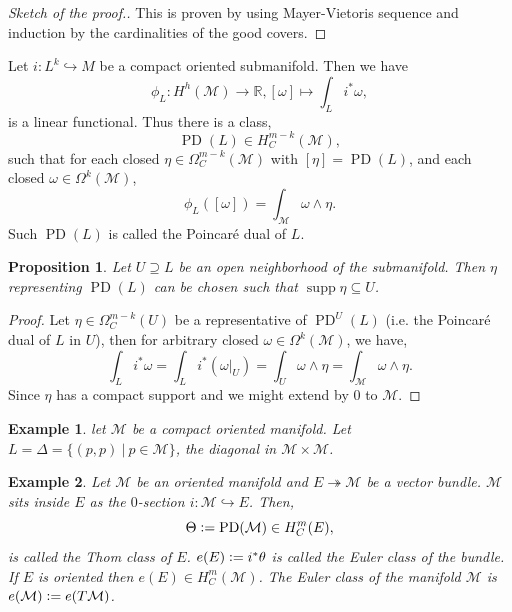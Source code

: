 \documentclass[10pt]{article}
\newtheorem{proposition}{Proposition}[section]
\newtheorem{example}{Example}[section]
\DeclareMathOperator{\supp}{supp}
\DeclareMathOperator{\PD}{PD}
\newcommand{\defeq}{\vcentcolon=}
\newcommand{\R}[0]{\mathbb{R}}
\newcommand{\M}[0]{\mathcal{M}}
\newcommand{\sep}[0]{\:|\:}
\begin{document}
\begin{proof}[Sketch of the proof.]
  This is proven by using Mayer-Vietoris sequence and induction by the cardinalities of the good covers.
\end{proof}
Let $i:L^k\hookrightarrow M$ be a compact oriented submanifold. Then we have 
\begin{equation*}
  \phi_L:H^h(\M)\to\R, [\omega]\mapsto\int_L i^*\omega,
\end{equation*}
is a linear functional. Thus there is a class, 
\begin{equation*}
  \PD(L) \in H^{m-k}_C(\M),
\end{equation*}
such that for each closed $\eta\in\Omega_C^{m-k}(\M)$ with $[\eta]=\PD(L)$, and each closed $\omega\in\Omega^k(\M)$,
\begin{equation*}
  \phi_L([\omega]) = \int_\M\omega\wedge\eta.
\end{equation*}
Such $\PD(L)$ is called the Poincaré dual of $L$.
\begin{proposition}
  Let $U\supseteq L$ be an open neighborhood of the submanifold. Then $\eta$ representing $\PD(L)$ can be chosen such that $\supp\eta\subseteq U$.
\end{proposition}
\begin{proof}
  Let $\eta\in\Omega^{m-k}_C(U)$ be a representative of $\PD^U(L)$ (i.e. the Poincaré dual of $L$ in $U$), then for arbitrary closed $\omega\in\Omega^k(\M)$, we have,
  \begin{equation*}
    \int_Li^*\omega=\int_Li^*(\omega|_U)=\int_U\omega\wedge\eta=\int_\M\omega\wedge\eta.
  \end{equation*}
  Since $\eta$ has a compact support and we might extend by $0$ to $\M$.
\end{proof}
\begin{example}
  let $\M$ be a compact oriented manifold. Let $L=\Delta=\{(p,p)\sep p\in\M\}$, the diagonal in $\M\times\M$. 
\end{example}
\begin{example}
  Let $\M$ be an oriented manifold and $E\twoheadrightarrow\M$ be a vector bundle. $\M$ sits inside $E$ as the $0$-section $i:\M\hookrightarrow E$. Then,
  \begin{equation*}
    \Theta\defeq\PD(\M)\in H_C^m(E),
  \end{equation*}
  is called the Thom class of $E$. $e(E)\defeq i^*\theta$ is called the Euler class of the bundle. If $E$ is oriented then $e(E)\in H_C^m(\M)$. The Euler class of the manifold $\M$ is $e(\M)\defeq e(T\M)$.
\end{example}
\end{document}
